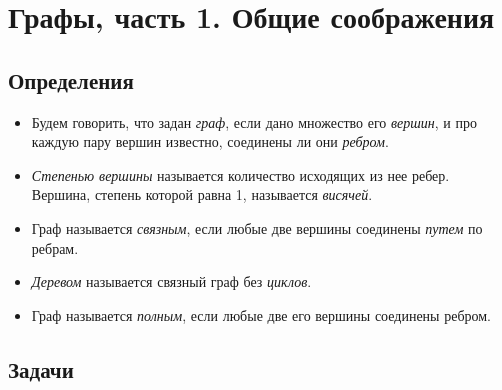

\section*{Графы, часть 1. Общие соображения}



\subsection*{Определения}

\begin{itemize}

\item
Будем говорить, что задан \emph{граф}, если дано множество его \emph{вершин}, и
про каждую пару вершин известно, соединены ли они \emph{ребром}.

\item
\emph{Степенью вершины} называется количество исходящих из нее ребер.
Вершина, степень которой равна 1, называется \emph{висячей}.

\item
Граф называется \emph{связным}, если любые две вершины соединены \emph{путем}
по ребрам.

\item
\emph{Деревом} называется связный граф без \emph{циклов}.

\item
Граф называется \emph{полным}, если любые две его вершины соединены ребром.

\end{itemize}


\subsection*{Задачи}
  
